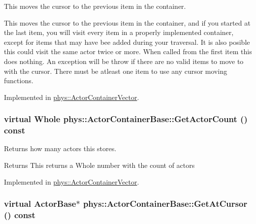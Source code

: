 This moves the cursor to the previous item in the container. 

This moves the cursor to the previous item in the container, and if you started at the last item, you will visit every item in a properly implemented container, except for items that may have bee added during your traversal. It is also posible this could visit the same actor twice or more. When called from the first item this does nothing. An exception will be throw if there are no valid items to move to with the cursor. There must be atleast one item to use any cursor moving functions. 

Implemented in \hyperlink{classphys_1_1ActorContainerVector_ac483bcdf348f55dc8b04a8805a002413}{phys::ActorContainerVector}.

\hypertarget{classphys_1_1ActorContainerBase_aa5ec651d4634b2d90efe2a76f9d2fbdd}{
\subsubsection[{GetActorCount}]{\setlength{\rightskip}{0pt plus 5cm}virtual {\bf Whole} phys::ActorContainerBase::GetActorCount () const}}
\label{d1/d00/classphys_1_1ActorContainerBase_aa5ec651d4634b2d90efe2a76f9d2fbdd}


Returns how many actors this stores. 

\begin{DoxyReturn}{Returns}
This returns a Whole number with the count of actors 
\end{DoxyReturn}


Implemented in \hyperlink{classphys_1_1ActorContainerVector_a6d2e5e68e23f5798ad10ba41e479d0f7}{phys::ActorContainerVector}.

\hypertarget{classphys_1_1ActorContainerBase_a2c8fb86a9e188aece105b2a753ccc19a}{
\subsubsection[{GetAtCursor}]{\setlength{\rightskip}{0pt plus 5cm}virtual {\bf ActorBase}$\ast$ phys::ActorContainerBase::GetAtCursor () const}}
\label{d1/d00/classphys_1_1ActorContainerBase_a2c8fb86a9e188aece105b2a753ccc19a}


